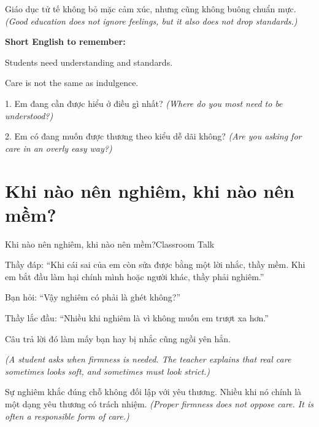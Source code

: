 \begin{baihoc}
Giáo dục tử tế không bỏ mặc cảm xúc, nhưng cũng không buông chuẩn mực.
\textit{(Good education does not ignore feelings, but it also does not drop standards.)}
\end{baihoc}

\begin{ghinhoanh}
\textbf{Short English to remember:}

Students need understanding and standards.

Care is not the same as indulgence.
\end{ghinhoanh}

\begin{tuhocnhanh}
1. Em đang cần được hiểu ở điều gì nhất? \textit{(Where do you most need to be understood?)}

2. Em có đang muốn được thương theo kiểu dễ dãi không? \textit{(Are you asking for care in an overly easy way?)}
\end{tuhocnhanh}
\ngancach

\section{Khi nào nên nghiêm, khi nào nên mềm?}
\begin{truyen}{Khi nào nên nghiêm, khi nào nên mềm?}{Classroom Talk}

Thầy đáp: ``Khi cái sai của em còn sửa được bằng một lời nhắc, thầy mềm. Khi em bắt đầu làm hại chính mình hoặc người khác, thầy phải nghiêm.''

Bạn hỏi: ``Vậy nghiêm có phải là ghét không?''

Thầy lắc đầu: ``Nhiều khi nghiêm là vì không muốn em trượt xa hơn.''

Câu trả lời đó làm mấy bạn hay bị nhắc cũng ngồi yên hẳn.

\textit{(A student asks when firmness is needed. The teacher explains that real care sometimes looks soft, and sometimes must look strict.)}
\end{truyen}

\begin{baihoc}
Sự nghiêm khắc đúng chỗ không đối lập với yêu thương. Nhiều khi nó chính là một dạng yêu thương có trách nhiệm.
\textit{(Proper firmness does not oppose care. It is often a responsible form of care.)}
\end{baihoc}

